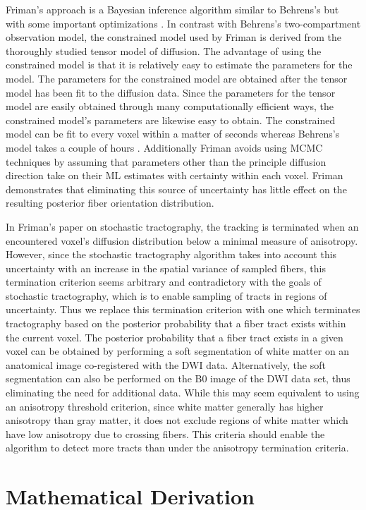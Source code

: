 Friman's approach is a Bayesian inference algorithm similar to Behrens's but with some important optimizations \cite{frimanTMI06}.  In contrast with Behrens's two-compartment observation model, the constrained model used by Friman is derived from the thoroughly studied tensor model of diffusion.  The advantage of using the constrained model is that it is relatively easy to estimate the parameters for the model.  The parameters for the constrained model are obtained after the tensor model has been fit to the diffusion data.  Since the parameters for the tensor model are easily obtained through many computationally efficient ways, the constrained model's parameters are likewise easy to obtain.  The constrained model can be fit to every voxel within a matter of seconds whereas Behrens's model takes a couple of hours \cite{frimanTMI06}.  Additionally Friman avoids using MCMC techniques by assuming that parameters other than the principle diffusion direction take on their ML estimates with certainty within each voxel.  Friman demonstrates that eliminating this source of uncertainty has little effect on the resulting posterior fiber orientation distribution.

In Friman's paper on stochastic tractography, the tracking is terminated when an encountered voxel's diffusion distribution below a minimal measure of anisotropy.  However, since the stochastic tractography algorithm takes into account this uncertainty with an increase in the spatial variance of sampled fibers, this termination criterion seems arbitrary and contradictory with the goals of stochastic tractography, which is to enable sampling of tracts in regions of uncertainty.  Thus we replace this termination criterion with one which terminates tractography based on the posterior probability that a fiber tract exists within the current voxel.  The posterior probability that a fiber tract exists in a given voxel can be obtained by performing a soft segmentation of white matter on an anatomical image co-registered with the DWI data.  Alternatively, the soft segmentation can also be performed on the B0 image of the DWI data set, thus eliminating the need for additional data.  While this may seem equivalent to using an anisotropy threshold criterion, since white matter generally has higher anisotropy than gray matter, it does not exclude regions of white matter which have low anisotropy due to crossing fibers.  This criteria should enable the algorithm to detect more tracts than under the anisotropy termination criteria.

\section{Mathematical Derivation}
